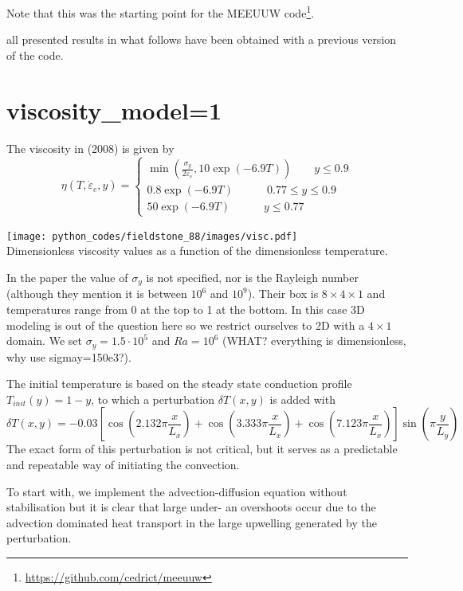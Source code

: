 Note that this \stone was the starting point for the 
MEEUUW code\footnote{\url{https://github.com/cedrict/meeuuw}}.


{\color{red} all presented results in what follows 
have been obtained with a previous version of the code.}

\newpage
\section*{viscosity\_model=1}

The viscosity in \textcite{bugg08} (2008) is given by 
\[
\eta(T,\dot{\varepsilon}_e,y) =
\left\{
\begin{array}{c}
\min \left(  \frac{\sigma_y}{2 \dot{\varepsilon}_e} , 10\exp(-6.9T)  \right) \qquad y\le 0.9 \\
0.8 \exp(-6.9T) \qquad\quad  0.77\le y \le 0.9 \\
50 \exp(-6.9T) \qquad\quad y \le 0.77 
\end{array}
\right.
\]

\begin{center}
\texttt{[image: python\_codes/fieldstone\_88/images/visc.pdf]}\\
{\captionfont Dimensionless viscosity values as a function of the dimensionless temperature.}
\end{center}

In the paper the value of $\sigma_y$ is not specified, nor is the Rayleigh number (although 
they mention it is between $10^6$ and $10^9$).
Their box is $8\times 4 \times 1$ and temperatures range from 0 at the top to 1 at the bottom.
In this case 3D modeling is out of the question here so we restrict ourselves to 2D with a $4\times 1$ domain. 
We set $\sigma_y=1.5\cdot 10^5$ and $Ra=10^6$ (WHAT? everything is dimensionless, why use sigmay=150e3?).

The initial temperature is based on the steady state conduction profile $T_{init}(y)=1-y$, to which a
perturbation $\delta T(x,y)$ is added with 
\[
\delta T(x,y) = -0.03 \left[ \cos\left(2.132\pi \frac{x}{L_x}\right)
+ \cos\left(3.333\pi  \frac{x}{L_x}\right)
+ \cos\left(7.123 \pi  \frac{x}{L_x} \right) \right] \sin \left(\pi  \frac{y}{L_y} \right)
\]
The exact form of this perturbation is not critical, but it serves as a predictable and repeatable way of 
initiating the convection.

To start with, we implement the advection-diffusion equation without stabilisation but it is clear that 
large under- an overshoots occur due to the advection dominated heat transport in the large upwelling 
generated by the perturbation.

